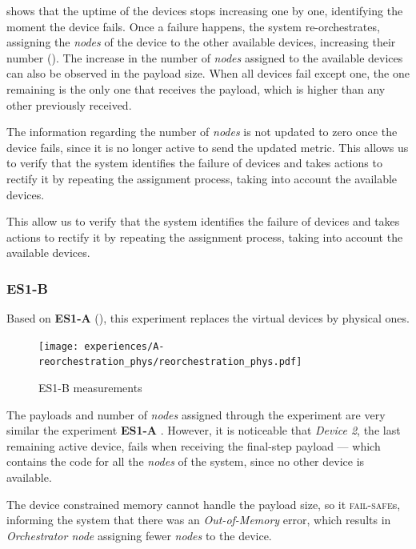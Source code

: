  shows that the uptime of the devices stops increasing one by one, identifying the moment the device fails. Once a failure happens, the system re-orchestrates, assigning the \textit{nodes} of the device to the other available devices, increasing their number (\cf {}). The increase in the number of \textit{nodes} assigned to the available devices can also be observed in the payload size. When all devices fail except one, the one remaining is the only one that receives the payload, which is higher than any other previously received.

The information regarding the number of \textit{nodes} is not updated to zero once the device fails, since it is no longer active to send the updated metric. This allows us to verify that the system identifies the failure of devices and takes actions to rectify it by repeating the assignment process, taking into account the available devices.

This allow us to verify that the system identifies the failure of devices and takes actions to rectify it by repeating the assignment process, taking into account the available devices.


\subsubsection{ES1-B}

Based on \textbf{ES1-A} (\cf {}), this experiment replaces the virtual devices by physical ones. 

\begin{figure}[h]
    \centering
    \texttt{[image: experiences/A-reorchestration\_phys/reorchestration\_phys.pdf]}
    \caption{ES1-B measurements}
    \label{fig:experiment_a_phys_graph}
\end{figure}

The payloads and number of \textit{nodes} assigned through the experiment are very similar the experiment \textbf{ES1-A} . However, it is noticeable that \textit{Device 2}, the last remaining active device, fails when receiving the final-step payload --- which contains the code for all the \textit{nodes} of the system, since no other device is available. 

The device constrained memory cannot handle the payload size, so it \textsc{fail-safe}s, informing the system that there was an \textit{Out-of-Memory} error, which results in \textit{Orchestrator node} assigning fewer \textit{nodes} to the device.

